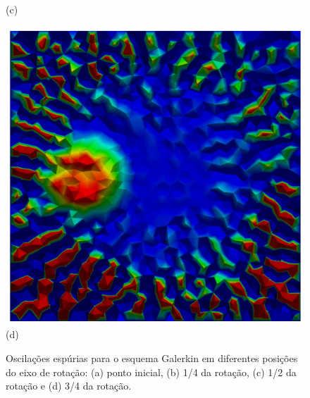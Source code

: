 \begin{figure}[H]
\begin{minipage}{.5\linewidth}
      (c)
     \end{minipage}%
     \begin{minipage}{.5\linewidth}
      \centering
      \includegraphics[scale=0.21]{./02_chaps/cap_validation/figure/galerkin_950.png}\\
      (d)
     \end{minipage}
     \medskip
     \caption{Oscilações espúrias para o esquema Galerkin em diferentes posições do eixo de rotação:
     (a) ponto inicial, 
     (b) 1/4 da rotação,
     (c) 1/2 da rotação e
     (d) 3/4 da rotação.}
     \label{galerkin}
\end{figure}

